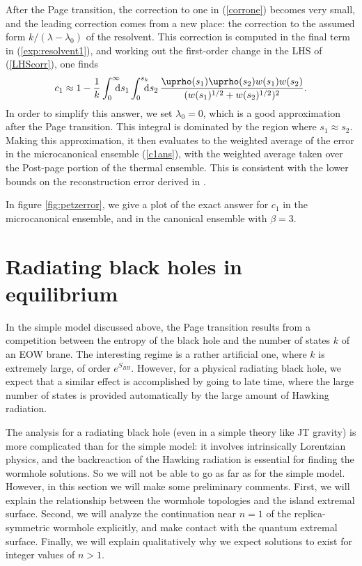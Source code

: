 \documentclass[11pt]{article}
\numberwithin{equation}{section}
\begin{document}
After the Page transition, the correction to one in (\ref{corrone}) becomes very small, and the leading correction comes from a new place: the correction to the assumed form $k/(\lambda-\lambda_0)$ of the resolvent. This correction is computed in the final term in (\ref{exp:resolvent1}), and working out the first-order change in the LHS of (\ref{LHScorr}), one finds
\begin{align}
c_1 \approx 1 - \frac{1}{k}\int_0^\infty\hspace{-7pt}\mathrm{d}s_1\int_0^{s_k}\hspace{-7pt}\mathrm{d}s_2\,\frac{\uprho(s_1)\uprho(s_2)w(s_1)w(s_2)}{(w(s_1)^{1/2}+w(s_2)^{1/2})^2}.
\end{align}
In order to simplify this answer, we set $\lambda_0 = 0$, which is a good approximation after the Page transition. This integral is dominated by the region where $s_1\approx s_2$. Making this approximation, it then evaluates to the weighted average of the error in the microcanonical ensemble (\ref{c1ans}), with the weighted average taken over the Post-page portion of the thermal ensemble. This is consistent with the lower bounds on the reconstruction error derived in \cite{Hayden:2018khn, Penington:2019npb}.

In figure \ref{fig:petzerror}, we give a plot of the exact answer for $c_1$ in the microcanonical ensemble, and in the canonical ensemble with $\beta = 3$.



\section{Radiating black holes in equilibrium}\label{sec:JT}
In the simple model discussed above, the Page transition results from a competition between the entropy of the black hole and the number of states $k$ of an EOW brane. The interesting regime is a rather artificial one, where $k$ is extremely large, of order $e^{S_{BH}}$. However, for a physical radiating black hole, we expect that a similar effect is accomplished by going to late time, where the large number of states is provided automatically by the large amount of Hawking radiation.

The analysis for a radiating black hole (even in a simple theory like JT gravity) is more complicated than for the simple model: it involves intrinsically Lorentzian physics, and the backreaction of the Hawking radiation is essential for finding the wormhole solutions. So we will not be able to go as far as for the simple model. However, in this section we will make some preliminary comments. First, we will explain the relationship between the wormhole topologies and the island extremal surface. Second, we will analyze the continuation near $n = 1$ of the replica-symmetric wormhole explicitly, and make contact with the quantum extremal surface. Finally, we will explain qualitatively why we expect solutions to exist for integer values of $n > 1$.
\end{document}
